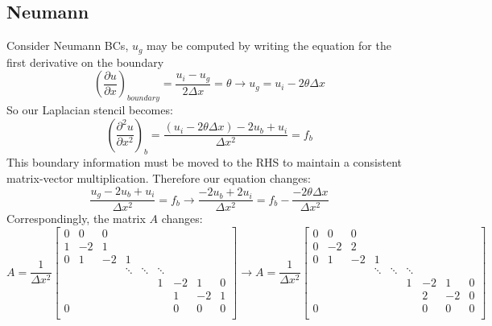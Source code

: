 \documentclass[landscape]{article}
\begin{document}
\subsection{Neumann}
Consider Neumann BCs, $u_g$ may be computed by writing the equation for the first derivative on the boundary
\begin{equation}
  \left(\frac{\partial u}{\partial x}\right)_{boundary}
  = \frac{u_i - u_g}{2\Delta x} = \theta
  \rightarrow
  u_g = u_i - 2\theta \Delta x
\end{equation}
So our Laplacian stencil becomes:
\begin{equation}
   \left(\frac{\partial^2 u}{\partial x^2}\right)_{b} = 
   \frac{(u_i - 2\theta \Delta x) - 2 u_b + u_i}{\Delta x^2} = f_b
\end{equation}
This boundary information must be moved to the RHS to maintain a consistent matrix-vector multiplication. Therefore our equation changes:
\begin{equation}
   \frac{u_g - 2 u_b + u_i}{\Delta x^2} = f_b
   \rightarrow
   \frac{- 2u_b + 2u_i}{\Delta x^2} = f_b - \frac{-2\theta \Delta x}{\Delta x^2}
\end{equation}
Correspondingly, the matrix $A$ changes:
\[ A = \frac{1}{\Delta x^2} \left[\begin{array}{ccccccccc}
0  & 0     & 0         &           &           &           &           &         &    \\
1  & -2    & 1         &           &           &           &           &         &    \\
0  & 1     & -2        & 1         &           &           &           &         &    \\
   &       &           & \ddots    & \ddots    & \ddots    &           &         &    \\
   &       &           &           &           & 1         & -2        & 1       &  0 \\
   &       &           &           &           &           &  1        & -2      &  1 \\
0  &       &           &           &           &           &  0        & 0       &  0 \\
\end{array} \right]
\rightarrow
A = \frac{1}{\Delta x^2} \left[\begin{array}{ccccccccc}
0  & 0     & 0         &           &           &           &           &         &    \\
0  & -2    & 2         &           &           &           &           &         &    \\
0  & 1     & -2        & 1         &           &           &           &         &    \\
   &       &           & \ddots    & \ddots    & \ddots    &           &         &    \\
   &       &           &           &           & 1         & -2        & 1       &  0 \\
   &       &           &           &           &           &  2        & -2      &  0 \\
0  &       &           &           &           &           &  0        & 0       &  0 \\
\end{array} \right]
\]
\end{document}
